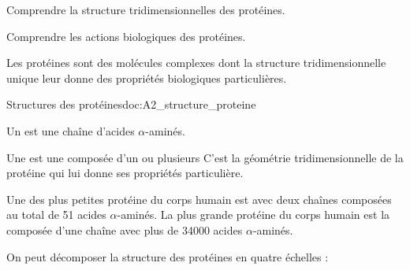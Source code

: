 \teteTermStssBiom

\vspace*{-38pt}

\begin{objectifs}
  \item Comprendre la structure tridimensionnelles des protéines.
  \item Comprendre les actions biologiques des protéines.
\end{objectifs}

\begin{contexte}
  Les protéines sont des molécules complexes dont la structure tridimensionnelle unique leur donne des propriétés biologiques particulières.
  
\end{contexte}


\begin{doc}{Structures des protéines}{doc:A2_structure_proteine}
  \phantom{b}\vspace*{-20pt}
  
  \begin{importants}
    Un  est une chaîne d'acides $\alpha$-aminés.
    
    Une  est une  composée d'un ou plusieurs 
    C'est la géométrie tridimensionnelle de la protéine qui lui donne ses propriétés particulière.
  \end{importants}
  
  Une des plus petites protéine du corps humain est  avec deux chaînes composées au total de 51 acides $\alpha$-aminés.
  La plus grande protéine du corps humain est la  composée d'une chaîne avec plus de \num{34000} acides $\alpha$-aminés.

  On peut décomposer la structure des protéines en quatre échelles :
  \begin{center}
  \end{center}
\end{doc}

